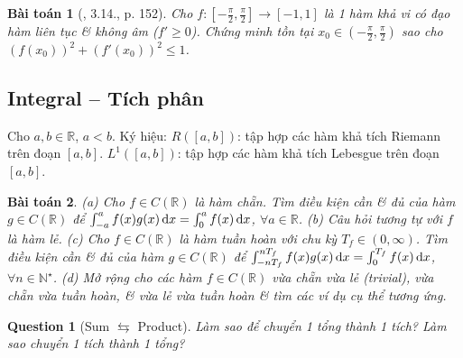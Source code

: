 \documentclass{article}
\newtheorem{baitoan}{Bài toán}
\newtheorem{question}{Question}
\begin{document}
\begin{baitoan}[\cite{Quoc_Long_Dat_Nam_VMC}, 3.14., p. 152]
	Cho $f:\left[-\frac{\pi}{2},\frac{\pi}{2}\right]\to[-1,1]$ là 1 hàm khả vi có đạo hàm liên tục \& không âm ($f'\ge0$). Chứng minh tồn tại $x_0\in\left(-\frac{\pi}{2},\frac{\pi}{2}\right)$ sao cho $(f(x_0))^2 + (f'(x_0))^2\le1$.
\end{baitoan}


\subsection{Integral -- Tích phân}
Cho $a,b\in\mathbb{R}$, $a < b$. Ký hiệu: $R([a,b])$: tập hợp các hàm khả tích Riemann trên đoạn $[a,b]$. $L^1([a,b])$: tập hợp các hàm khả tích Lebesgue trên đoạn $[a,b]$.

\begin{baitoan}
	(a) Cho $f\in C(\mathbb{R})$ là hàm chẵn. Tìm điều kiện cần \& đủ của hàm $g\in C(\mathbb{R})$ để $\int_{-a}^a f(x)g(x)\,{\rm d}x = \int_0^a f(x)\,{\rm d}x$, $\forall a\in\mathbb{R}$. (b) Câu hỏi tương tự với $f$ là hàm lẻ. (c) Cho $f\in C(\mathbb{R})$ là hàm tuần hoàn với chu kỳ $T_f\in(0,\infty)$. Tìm điều kiện cần \& đủ của hàm $g\in C(\mathbb{R})$ để  $\int_{-nT_f}^{nT_f} f(x)g(x)\,{\rm d}x = \int_0^{T_f} f(x)\,{\rm d}x$, $\forall n\in\mathbb{N}^\star$. (d) Mở rộng cho các hàm $f\in C(\mathbb{R})$ vừa chẵn vừa lẻ (trivial), vừa chẵn vừa tuần hoàn, \& vừa lẻ vừa tuần hoàn \& tìm các ví dụ cụ thể tương ứng.
\end{baitoan}

\begin{question}[Sum $\leftrightarrows$ Product]
	Làm sao để chuyển 1 tổng thành 1 tích? Làm sao chuyển 1 tích thành 1 tổng?
\end{question}
\end{document}
